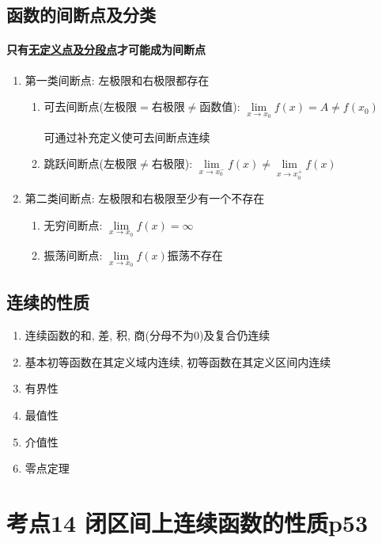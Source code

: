 \subsection{函数的间断点及分类}
\paragraph{只有\underline{无定义点及分段点}才可能成为间断点}
\begin{enumerate}
    \item 第一类间断点: 左极限和右极限都存在
    \begin{enumerate}
        \item 可去间断点(左极限$ = $右极限$ \neq $函数值): $ \lim\limits_{x\rightarrow x_{0}}f(x)=A\neq f(x_{0}) $
        \begin{tcolorbox}
            可通过补充定义使可去间断点连续
        \end{tcolorbox}
        \item 跳跃间断点(左极限$ \neq $右极限): $ \lim\limits_{x\rightarrow x_{0}^{-}}f(x) \neq \lim\limits_{x\rightarrow x_{0}^{+}}f(x) $
    \end{enumerate}
    \item 第二类间断点: 左极限和右极限至少有一个不存在
    \begin{enumerate}
        \item 无穷间断点: $ \lim\limits_{x\rightarrow x_{0}}f(x)=\infty $
        \item 振荡间断点: $ \lim\limits_{x\rightarrow x_{0}}f(x) $振荡不存在
    \end{enumerate}
\end{enumerate}
\subsection{连续的性质}
\begin{enumerate}
    \item 连续函数的和, 差, 积, 商(分母不为0)及复合仍连续
    \item 基本初等函数在其定义域内连续, 初等函数在其定义区间内连续
    \item 有界性
    \item 最值性
    \item 介值性
    \item 零点定理
\end{enumerate}

\section{考点14 闭区间上连续函数的性质p53}

